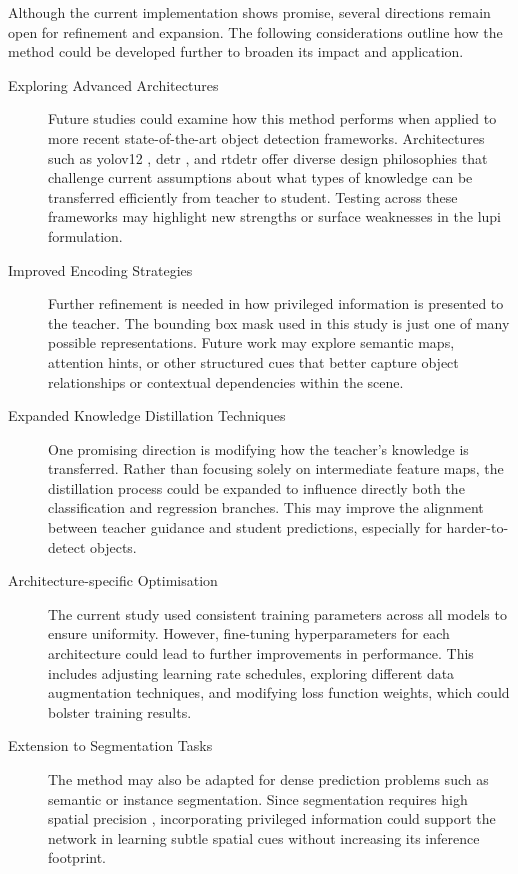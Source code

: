 Although the current implementation shows promise, several directions remain open for refinement and expansion. The following considerations outline how the method could be developed further to broaden its impact and application.

\begin{description}

\item[Exploring Advanced Architectures]
Future studies could examine how this method performs when applied to more recent state-of-the-art object detection frameworks. Architectures such as \gls{yolo}v12 \cite{yolov12}, \gls{detr} \cite{detr}, and \gls{rtdetr} \cite{rt-detr} offer diverse design philosophies that challenge current assumptions about what types of knowledge can be transferred efficiently from teacher to student. Testing across these frameworks may highlight new strengths or surface weaknesses in the \gls{lupi} formulation.

\item[Improved Encoding Strategies]
Further refinement is needed in how privileged information is presented to the teacher. The bounding box mask used in this study is just one of many possible representations. Future work may explore semantic maps, attention hints, or other structured cues that better capture object relationships or contextual dependencies within the scene.

\item[Expanded Knowledge Distillation Techniques]
One promising direction is modifying how the teacher’s knowledge is transferred. Rather than focusing solely on intermediate feature maps, the distillation process could be expanded to influence directly both the classification and regression branches. This may improve the alignment between teacher guidance and student predictions, especially for harder-to-detect objects.

\item[Architecture-specific Optimisation]
The current study used consistent training parameters across all models to ensure uniformity. However, fine-tuning hyperparameters for each architecture could lead to further improvements in performance. This includes adjusting learning rate schedules, exploring different data augmentation techniques, and modifying loss function weights, which could bolster training results.

\item[Extension to Segmentation Tasks]
The method may also be adapted for dense prediction problems such as semantic or instance segmentation. Since segmentation requires high spatial precision \cite{maskrcnn}, incorporating privileged information could support the network in learning subtle spatial cues without increasing its inference footprint.

\end{description}

